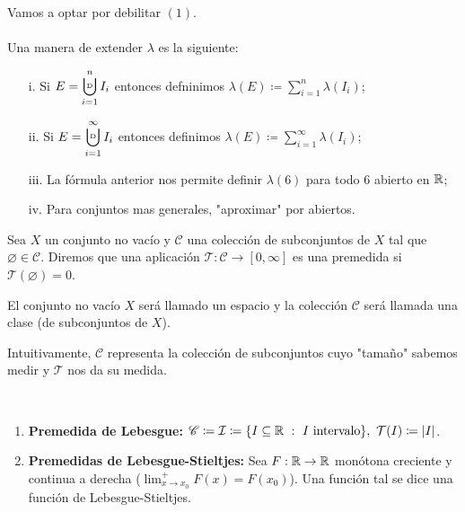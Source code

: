 \documentclass[a4paper]{report}
\newcommand{\bigcupd}{\mathop{\ensurestackMath{\stackinset{l}{}{c}{+.25ex}{\hspace{3pt}{\text{\tiny{D}}}}{\displaystyle{\bigcup}}}}}
\begin{document}
	\noindent Vamos a optar por debilitar $(1)$. \\\\
	\noindent Una manera de extender $\lambda$ es la siguiente:
	\begin{enumerate}
		\item[i.] Si $E = \displaystyle\bigcupd_{i=1}^{n} I_i$ entonces defninimos $\lambda(E) \coloneq \sum_{i=1}^{n} \lambda (I_i)$;

		\item[ii.] Si $E = \displaystyle\bigcupd_{i=1}^{\infty} I_i$ entonces definimos $\lambda(E) \coloneq \sum_{i=1}^{\infty} \lambda (I_i)$;

		\item[iii.] La fórmula anterior nos permite definir $\lambda (6)$ para todo $6$ abierto en $\mathbb{R}$;

		\item[iv.] Para conjuntos mas generales, "aproximar" por abiertos. 
	\end{enumerate}

	\begin{definition}[premedida]
		Sea $X$ un conjunto no vacío y $\mathscr{C}$ una colección de subconjuntos de $X$ tal que $\varnothing \in \mathscr{C}$. Diremos que una aplicación $\mathcal{T} : \mathscr{C} \to [0,\infty]$ es una premedida si $\mathcal{T} (\varnothing)=0$.
	\end{definition}

	\begin{remark}
		El conjunto no vacío $X$ será llamado un espacio y la colección $\mathscr{C}$ será llamada una clase (de subconjuntos de $X$).
	\end{remark}

	\noindent Intuitivamente, $\mathscr{C}$ representa la colección de subconjuntos cuyo "tamaño" sabemos medir y $\mathcal{T}$ nos da su medida.

	\begin{eg}~
		\begin{enumerate}
			\item \textbf{Premedida de Lebesgue:} $\mathscr{C} \coloneq \mathcal{I} \coloneq \{ I \subseteq \mathbb{R} \ : \ I \text{ intervalo}\}, \ \mathcal{T}(I) \coloneq |I|$.

			\item \textbf{Premedidas de Lebesgue-Stieltjes:} Sea $F:\mathbb{R} \to \mathbb{R}$ monótona creciente y continua a derecha ($\lim_{x \to x_0}^{+} F(x) = F(x_0)$). Una función tal se dice una función de Lebesgue-Stieltjes. 
		\end{enumerate}
	\end{eg}
\end{document}
